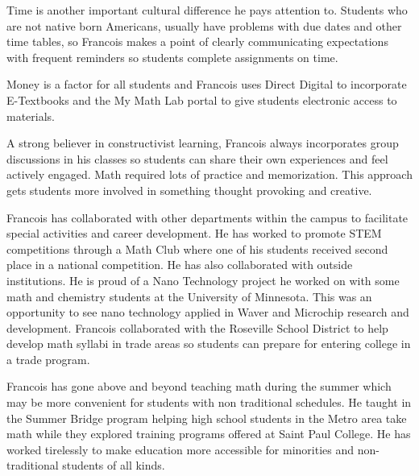\documentclass[
]{book}
\begin{document}
Time is another important cultural difference he pays attention to. Students who are not native born Americans, usually have problems with due dates and other time tables, so Francois makes a point of clearly communicating expectations with frequent reminders so students complete assignments on time.

Money is a factor for all students and Francois uses Direct Digital to incorporate E-Textbooks and the My Math Lab portal to give students electronic access to materials.

A strong believer in constructivist learning, Francois always incorporates group discussions in his classes so students can share their own experiences and feel actively engaged. Math required lots of practice and memorization. This approach gets students more involved in something thought provoking and creative.

Francois has collaborated with other departments within the campus to facilitate special activities and career development. He has worked to promote STEM competitions through a Math Club where one of his students received second place in a national competition. He has also collaborated with outside institutions. He is proud of a Nano Technology project he worked on with some math and chemistry students at the University of Minnesota. This was an opportunity to see nano technology applied in Waver and Microchip research and development. Francois collaborated with the Roseville School District to help develop math syllabi in trade areas so students can prepare for entering college in a trade program.

Francois has gone above and beyond teaching math during the summer which may be more convenient for students with non traditional schedules. He taught in the Summer Bridge program helping high school students in the Metro area take math while they explored training programs offered at Saint Paul College. He has worked tirelessly to make education more accessible for minorities and non-traditional students of all kinds.

  
\end{document}
